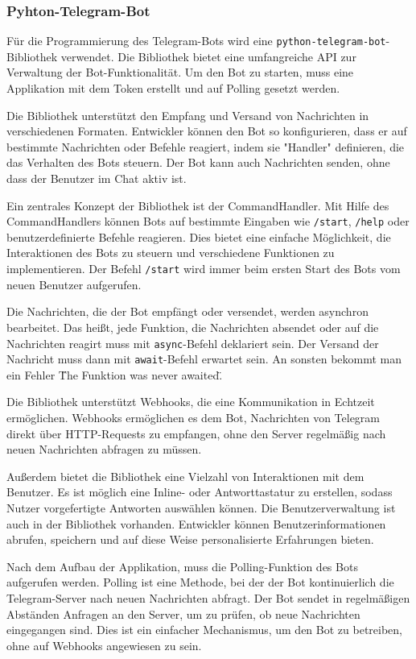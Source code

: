 \documentclass[12pt, letterpaper]{article}
\begin{document}
\subsubsection{Pyhton-Telegram-Bot}
\label{sec:telegram-bot}
\par Für die Programmierung des Telegram-Bots wird eine \texttt{python-telegram-bot}-Bibliothek verwendet. Die Bibliothek bietet eine umfangreiche API zur Verwaltung der Bot-Funktionalität. Um den Bot zu starten, muss eine Applikation mit dem Token erstellt und auf Polling gesetzt werden.
\par Die Bibliothek unterstützt den Empfang und Versand von Nachrichten in verschiedenen Formaten. Entwickler können den Bot so konfigurieren, dass er auf bestimmte Nachrichten oder Befehle reagiert, indem sie "Handler" definieren, die das Verhalten des Bots steuern. Der Bot kann auch Nachrichten senden, ohne dass der Benutzer im Chat aktiv ist.
\par Ein zentrales Konzept der Bibliothek ist der CommandHandler. Mit Hilfe des CommandHandlers können Bots auf bestimmte Eingaben wie \texttt{/start}, \texttt{/help} oder benutzerdefinierte Befehle reagieren. Dies bietet eine einfache Möglichkeit, die Interaktionen des Bots zu steuern und verschiedene Funktionen zu implementieren. Der Befehl \texttt{/start} wird immer beim ersten Start des Bots vom neuen Benutzer aufgerufen.
\par Die Nachrichten, die der Bot empfängt oder versendet, werden asynchron bearbeitet. Das heißt, jede Funktion, die Nachrichten absendet oder auf die Nachrichten reagirt muss mit \texttt{async}-Befehl deklariert sein. Der Versand der Nachricht muss dann mit \texttt{await}-Befehl erwartet sein. An sonsten bekommt man ein Fehler \"The Funktion was never awaited\".
\par Die Bibliothek unterstützt Webhooks, die eine Kommunikation in Echtzeit ermöglichen. Webhooks ermöglichen es dem Bot, Nachrichten von Telegram direkt über HTTP-Requests zu empfangen, ohne den Server regelmäßig nach neuen Nachrichten abfragen zu müssen.
\par Außerdem bietet die Bibliothek eine Vielzahl von Interaktionen mit dem Benutzer. Es ist möglich eine Inline- oder Antworttastatur zu erstellen, sodass Nutzer vorgefertigte Antworten auswählen können. Die Benutzerverwaltung ist auch in der Bibliothek vorhanden. Entwickler können Benutzerinformationen abrufen, speichern und auf diese Weise personalisierte Erfahrungen bieten.
\par Nach dem Aufbau der Applikation, muss die Polling-Funktion des Bots aufgerufen werden. Polling ist eine Methode, bei der der Bot kontinuierlich die Telegram-Server nach neuen Nachrichten abfragt. Der Bot sendet in regelmäßigen Abständen Anfragen an den Server, um zu prüfen, ob neue Nachrichten eingegangen sind. Dies ist ein einfacher Mechanismus, um den Bot zu betreiben, ohne auf Webhooks angewiesen zu sein.
\end{document}
